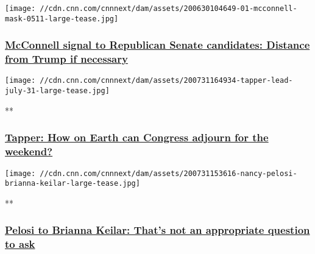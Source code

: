 \href{/2020/07/31/politics/senate-mcconnell-trump-firewall/index.html}{}

\texttt{[image: //cdn.cnn.com/cnnnext/dam/assets/200630104649-01-mcconnell-mask-0511-large-tease.jpg]}

\hypertarget{mcconnell-signal-to-republican-senate-candidates-distance-from-trump-if-necessary}{%
\subsubsection{\texorpdfstring{\href{/2020/07/31/politics/senate-mcconnell-trump-firewall/index.html}{McConnell
signal to Republican Senate candidates: Distance from Trump if
necessary}}{McConnell signal to Republican Senate candidates: Distance from Trump if necessary}}\label{mcconnell-signal-to-republican-senate-candidates-distance-from-trump-if-necessary}}

\href{/videos/politics/2020/07/31/congress-stimulus-unemployment-benefits-deadline-raju-sot-vpx.cnn}{}

\texttt{[image: //cdn.cnn.com/cnnnext/dam/assets/200731164934-tapper-lead-july-31-large-tease.jpg]}

**

\hypertarget{tapper-how-on-earth-can-congress-adjourn-for-the-weekend}{%
\subsubsection{\texorpdfstring{\href{/videos/politics/2020/07/31/congress-stimulus-unemployment-benefits-deadline-raju-sot-vpx.cnn}{Tapper:
How on Earth can Congress adjourn for the
weekend?}}{Tapper: How on Earth can Congress adjourn for the weekend?}}\label{tapper-how-on-earth-can-congress-adjourn-for-the-weekend}}

\href{/videos/politics/2020/07/31/nancy-pelosi-brianna-keilar-question-inapproproate-intv-nr-vpx.cnn}{}

\texttt{[image: //cdn.cnn.com/cnnnext/dam/assets/200731153616-nancy-pelosi-brianna-keilar-large-tease.jpg]}

**

\hypertarget{pelosi-to-brianna-keilar-thats-not-an-appropriate-question-to-ask-1}{%
\subsubsection{\texorpdfstring{\href{/videos/politics/2020/07/31/nancy-pelosi-brianna-keilar-question-inapproproate-intv-nr-vpx.cnn}{Pelosi
to Brianna Keilar: That's not an appropriate question to
ask}}{Pelosi to Brianna Keilar: That's not an appropriate question to ask}}\label{pelosi-to-brianna-keilar-thats-not-an-appropriate-question-to-ask-1}}

